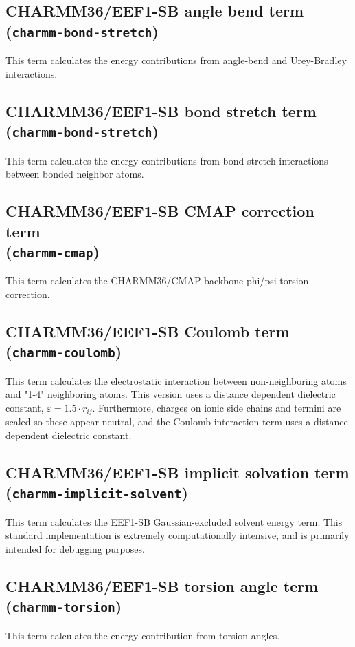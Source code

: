 \subsection{CHARMM36/EEF1-SB angle bend term\\(\texttt{charmm-bond-stretch})}
This term calculates the energy contributions from angle-bend and Urey-Bradley interactions.


\subsection{CHARMM36/EEF1-SB bond stretch term\\(\texttt{charmm-bond-stretch})}
This term calculates the energy contributions from bond stretch interactions between bonded neighbor atoms.

\subsection{CHARMM36/EEF1-SB CMAP correction term\\(\texttt{charmm-cmap})}
This term calculates the CHARMM36/CMAP backbone phi/psi-torsion correction.


\subsection{CHARMM36/EEF1-SB Coulomb term\\(\texttt{charmm-coulomb})}
This term calculates the electrostatic interaction between non-neighboring atoms and "1-4" neighboring atoms. 
This version uses a distance dependent dielectric constant, $\varepsilon = 1.5 \cdot r_{ij}$.
Furthermore, charges on ionic side chains and termini are scaled so these appear neutral, and the Coulomb interaction term uses a distance dependent dielectric constant.


\subsection{CHARMM36/EEF1-SB implicit solvation term\\(\texttt{charmm-implicit-solvent})}
This term calculates the EEF1-SB Gaussian-excluded solvent energy term.
This standard implementation is extremely computationally intensive,
and is primarily intended for debugging purposes.


\subsection{CHARMM36/EEF1-SB torsion angle term\\(\texttt{charmm-torsion})}
This term calculates the energy contribution from torsion angles.


